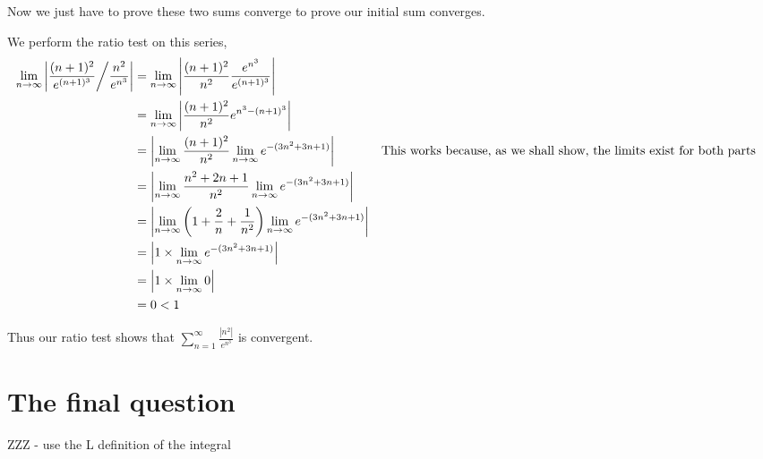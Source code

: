 \documentclass{article}
\begin{document}
Now we just have to prove these two sums converge to prove our initial sum
converges.

We perform the ratio test on this series,
\begin{align*}
    \lim_{n \to \infty} \left| \frac{(n+1)^2}{e^{(n+1)^3}} \middle/ \frac{n^2}{e^{n^3}} \right|
    &= \lim_{n \to \infty} \left| \frac{(n+1)^2}{n^2} \frac{e^{n^3}}{e^{(n+1)^3}} \right| \\
    &= \lim_{n \to \infty} \left| \frac{(n+1)^2}{n^2} e^{n^3-(n+1)^3} \right| \\
    &= \left| \lim_{n \to \infty} \frac{(n+1)^2}{n^2} \lim_{n \to \infty} e^{-(3n^2+3n+1)} \right|
    && \text{This works because, as we shall show, the limits exist for both parts} \\
    &= \left| \lim_{n \to \infty} \frac{n^2 + 2n + 1}{n^2} \lim_{n \to \infty} e^{-(3n^2+3n+1)} \right| \\
    &= \left| \lim_{n \to \infty} \left(1 + \frac{2}{n} + \frac{1}{n^2} \right) \lim_{n \to \infty} e^{-(3n^2+3n+1)} \right| \\
    &= \left| 1 \times \lim_{n \to \infty} e^{-(3n^2+3n+1)} \right| \\
    &= \left| 1 \times \lim_{n \to \infty} 0 \right| \\
    &= 0 < 1
\end{align*}

Thus our ratio test shows that $\sum_{n=1}^\infty \frac{\left| n^2 \right|}{e^{n^3}}$
is convergent.

\section{The final question}

ZZZ - use the L definition of the integral
\end{document}
